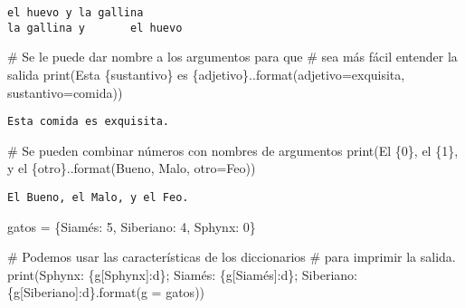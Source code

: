 \documentclass[
  letterpaper,
  DIV=11,
  numbers=noendperiod]{scrreprt}
\newenvironment{Shaded}{\begin{snugshade}}{\end{snugshade}}
\newcommand{\BuiltInTok}[1]{\textcolor[rgb]{0.00,0.23,0.31}{#1}}
\newcommand{\CommentTok}[1]{\textcolor[rgb]{0.37,0.37,0.37}{#1}}
\newcommand{\DecValTok}[1]{\textcolor[rgb]{0.68,0.00,0.00}{#1}}
\newcommand{\NormalTok}[1]{\textcolor[rgb]{0.00,0.23,0.31}{#1}}
\newcommand{\OperatorTok}[1]{\textcolor[rgb]{0.37,0.37,0.37}{#1}}
\newcommand{\SpecialCharTok}[1]{\textcolor[rgb]{0.37,0.37,0.37}{#1}}
\newcommand{\StringTok}[1]{\textcolor[rgb]{0.13,0.47,0.30}{#1}}
\begin{document}
\begin{verbatim}
el huevo y la gallina
la gallina y       el huevo      
\end{verbatim}

\begin{Shaded}
\begin{Highlighting}[]
\CommentTok{\# Se le puede dar nombre a los argumentos para que }
\CommentTok{\# sea más fácil entender la salida}
\BuiltInTok{print}\NormalTok{(}\StringTok{\textquotesingle{}Esta }\SpecialCharTok{\{sustantivo\}}\StringTok{ es }\SpecialCharTok{\{adjetivo\}}\StringTok{.\textquotesingle{}}\NormalTok{.}\BuiltInTok{format}\NormalTok{(adjetivo}\OperatorTok{=}\StringTok{\textquotesingle{}exquisita\textquotesingle{}}\NormalTok{, sustantivo}\OperatorTok{=}\StringTok{\textquotesingle{}comida\textquotesingle{}}\NormalTok{))}
\end{Highlighting}
\end{Shaded}

\begin{verbatim}
Esta comida es exquisita.
\end{verbatim}

\begin{Shaded}
\begin{Highlighting}[]
\CommentTok{\# Se pueden combinar números con nombres de argumentos}
\BuiltInTok{print}\NormalTok{(}\StringTok{\textquotesingle{}El }\SpecialCharTok{\{0\}}\StringTok{, el }\SpecialCharTok{\{1\}}\StringTok{, y el }\SpecialCharTok{\{otro\}}\StringTok{.\textquotesingle{}}\NormalTok{.}\BuiltInTok{format}\NormalTok{(}\StringTok{\textquotesingle{}Bueno\textquotesingle{}}\NormalTok{, }\StringTok{\textquotesingle{}Malo\textquotesingle{}}\NormalTok{, otro}\OperatorTok{=}\StringTok{\textquotesingle{}Feo\textquotesingle{}}\NormalTok{))}
\end{Highlighting}
\end{Shaded}

\begin{verbatim}
El Bueno, el Malo, y el Feo.
\end{verbatim}

\begin{Shaded}
\begin{Highlighting}[]
\NormalTok{gatos }\OperatorTok{=}\NormalTok{ \{}\StringTok{\textquotesingle{}Siamés\textquotesingle{}}\NormalTok{: }\DecValTok{5}\NormalTok{, }\StringTok{\textquotesingle{}Siberiano\textquotesingle{}}\NormalTok{: }\DecValTok{4}\NormalTok{, }\StringTok{\textquotesingle{}Sphynx\textquotesingle{}}\NormalTok{: }\DecValTok{0}\NormalTok{\}}

\CommentTok{\# Podemos usar las características de los diccionarios}
\CommentTok{\# para imprimir la salida.}
\BuiltInTok{print}\NormalTok{(}\StringTok{\textquotesingle{}Sphynx: }\SpecialCharTok{\{g[Sphynx]:d\}}\StringTok{; Siamés: }\SpecialCharTok{\{g[Siamés]:d\}}\StringTok{; Siberiano: }\SpecialCharTok{\{g[Siberiano]:d\}}\StringTok{\textquotesingle{}}\NormalTok{.}\BuiltInTok{format}\NormalTok{(g }\OperatorTok{=}\NormalTok{ gatos))}
\end{Highlighting}
\end{Shaded}
\end{document}
